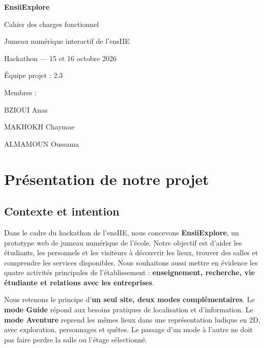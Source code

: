 \documentclass[11pt,a4paper]{article}
\begin{document}
\begin{titlepage}\centering
\vspace*{2.7cm}
{\Huge\bfseries\color{navy} EnsiiExplore\par}
\vspace{0.45cm}
{\Large Cahier des charges fonctionnel\par}
\vspace{0.5cm}
{\large Jumeau numérique interactif de l'ensIIE\par}
\vspace{1.2cm}
{\large Hackathon --- 15 et 16 octobre 2026\par}
\vspace{1.4cm}
{\large Équipe projet : 2.3\par}

\vspace{0.5cm}

{\normalsize
Membres :\par
\vspace{0.2cm}
BZIOUI Anas\par
MAKHOKH Chaymae\par
ALMAMOUN Oussama\par
}

\vfill

\end{titlepage}
\tableofcontents\newpage
\section{Présentation de notre projet}
\subsection{Contexte et intention}
Dans le cadre du hackathon de l'ensIIE, nous concevons \textbf{EnsiiExplore}, un prototype web de jumeau numérique de l'école. Notre objectif est d'aider les étudiants, les personnels et les visiteurs à découvrir les lieux, trouver des salles et comprendre les services disponibles. Nous souhaitons aussi mettre en évidence les quatre activités principales de l'établissement : \textbf{enseignement, recherche, vie étudiante et relations avec les entreprises}.

Nous retenons le principe d'\textbf{un seul site, deux modes complémentaires}. Le \textbf{mode Guide} répond aux besoins pratiques de localisation et d'information. Le \textbf{mode Aventure} reprend les mêmes lieux dans une représentation ludique en 2D, avec exploration, personnages et quêtes. Le passage d'un mode à l'autre ne doit pas faire perdre la salle ou l'étage sélectionné.
\end{document}
